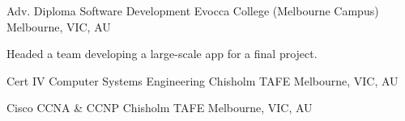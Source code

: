 

\begin{cventries}

  \cventry
    {Adv. Diploma Software Development} %
    {Evocca College (Melbourne Campus)} %
    {Melbourne, VIC, AU} %
    {
      \begin{cvitems}
        \item {Headed a team developing a large-scale app for a final project.}
      \end{cvitems}
    }

  \cventry
    {Cert IV Computer Systems Engineering}
    {Chisholm TAFE}
    {Melbourne, VIC, AU}

  \cventry
    {Cisco CCNA & CCNP}
    {Chisholm TAFE}
    {Melbourne, VIC, AU}

\end{cventries}
